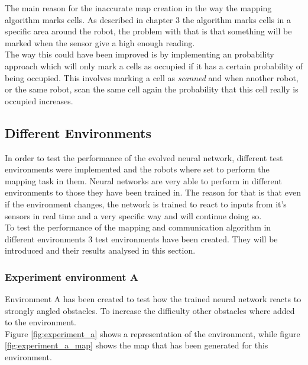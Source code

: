The main reason for the inaccurate map creation in the way the mapping algorithm marks cells. As described in chapter 3 the algorithm marks cells in a specific area around the robot, the problem with that is that something will be marked when the sensor give a high enough reading. \\
The way this could have been improved is by implementing an probability approach which will only mark a cells as occupied if it has a certain probability of being occupied. This involves marking a cell as \textit{scanned} and when another robot, or the same robot, scan the same cell again the probability that this cell really is occupied increases. 

\subsection{Different Environments}
In order to test the performance of the evolved neural network, different test environments were implemented and the robots where set to perform the mapping task in them. 
Neural networks are very able to perform in different environments to those they have been trained in. The reason for that is that even if the environment changes, the network is trained to react to inputs from it's sensors in real time and a very specific way and will continue doing so. \\
To test the performance of the mapping and communication algorithm in different environments 3 test environments have been created. They will be introduced and their results analysed in this section.\\

\subsubsection{Experiment environment A}
Environment A has been created to test how the trained neural network reacts to strongly angled obstacles. To increase the difficulty other obstacles where added to the environment.\\
Figure \ref{fig:experiment_a} shows a representation of the environment, while figure \ref{fig:experiment_a_map} shows the map that has been generated for this environment.  

